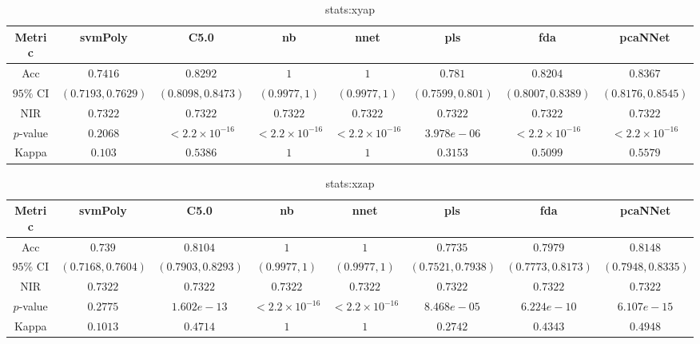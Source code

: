 \begin{table}[!ht]
	\centering
	\begin{tabular}{|c|c|c|c|c|c|c|c|}
		\hline
		Metric & svmPoly & C5.0 & nb & nnet & pls & fda & pcaNNet \\ \hline
		Acc & $0.7416$ & $0.8292$ & $1$ & $1$ & $0.781$ & $0.8204$ & $0.8367$ \\ \hline
		$95\%$ CI & $(0.7193, 0.7629)$ & $(0.8098, 0.8473)$ & $(0.9977, 1)$ & $(0.9977, 1)$ & $(0.7599, 0.801)$ & $(0.8007, 0.8389)$ & $(0.8176, 0.8545)$ \\ \hline
		NIR & $0.7322$ & $0.7322$ & $0.7322$ & $0.7322$ & $0.7322$ & $0.7322$ & $0.7322$ \\ \hline
		$p$-value & $0.2068$ & $< 2.2 \times {10}^{-16}$ & $< 2.2 \times {10}^{-16}$ & $< 2.2 \times {10}^{-16}$ & $3.978e-06$ & $< 2.2 \times {10}^{-16}$ & $< 2.2 \times {10}^{-16}$ \\ \hline
		Kappa & $0.103$ & $0.5386$ & $1$ & $1$ & $0.3153$ & $0.5099$ & $0.5579$ \\ \hline
	\end{tabular}
	\caption{stats:xyap}
	\label{tab:stats:xyap}
\end{table}

\begin{table}[!ht]
	\centering
	\begin{tabular}{|c|c|c|c|c|c|c|c|}
		\hline
		Metric & svmPoly & C5.0 & nb & nnet & pls & fda & pcaNNet \\ \hline
		Acc & $0.739$ & $0.8104$ & $1$ & $1$ & $0.7735$ & $0.7979$ & $0.8148$ \\ \hline
		$95\%$ CI & $(0.7168, 0.7604)$ & $(0.7903, 0.8293)$ & $(0.9977, 1)$ & $(0.9977, 1)$ & $(0.7521, 0.7938)$ & $(0.7773, 0.8173)$ & $(0.7948, 0.8335)$ \\ \hline
		NIR & $0.7322$ & $0.7322$ & $0.7322$ & $0.7322$ & $0.7322$ & $0.7322$ & $0.7322$ \\ \hline
		$p$-value & $0.2775$ & $1.602e-13$ & $< 2.2 \times {10}^{-16}$ & $< 2.2 \times {10}^{-16}$ & $8.468e-05$ & $6.224e-10$ & $6.107e-15$ \\ \hline
		Kappa & $0.1013$ & $0.4714$ & $1$ & $1$ & $0.2742$ & $0.4343$ & $0.4948$ \\ \hline
	\end{tabular}
	\caption{stats:xzap}
	\label{tab:stats:xzap}
\end{table}

